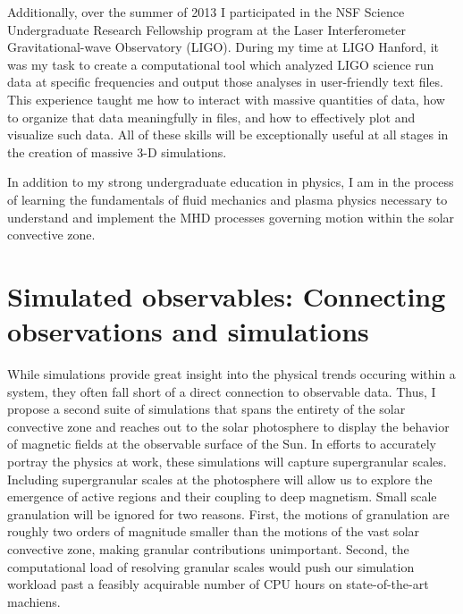 \documentclass[aasms,12pt]{article}
\begin{document}
Additionally, over the summer of 2013 I participated in the NSF Science
Undergraduate Research Fellowship program at the Laser Interferometer
Gravitational-wave Observatory (LIGO).  During my time at LIGO Hanford, it was
my task to create a computational tool which analyzed LIGO science run data at
specific frequencies and output those analyses
in user-friendly text files.  This experience taught me how to interact with
massive quantities of data, how to organize that data meaningfully in files,
and how to effectively plot and visualize such data.  All of these skills
will be exceptionally useful at all stages in the creation of 
massive 3-D simulations.

In addition to my strong undergraduate education in physics, I am in the process
of learning the fundamentals of fluid mechanics and plasma physics necessary to
understand and implement the MHD processes governing motion within the solar 
convective zone.

\section{Simulated observables: Connecting observations and simulations}
While simulations provide great insight into the
physical trends occuring within a system, they often fall short of a direct
connection to observable data.  Thus, I propose a second suite of simulations
that spans the entirety of the solar convective zone and reaches out to
the solar photosphere to display the behavior of magnetic fields
at the observable surface of the Sun.  In efforts to accurately portray the
physics at work, these simulations will capture supergranular 
scales.  
Including supergranular scales at the photosphere will allow us to explore the
emergence of active regions and their coupling to deep magnetism.
Small scale granulation will be ignored for two reasons.  
First, the motions of granulation are roughly two orders of magnitude
smaller than the motions of the vast solar convective zone, making granular
contributions unimportant.
Second, the computational load of resolving granular scales
would push our simulation workload past a feasibly acquirable number of CPU
hours on state-of-the-art machiens.
\end{document}
